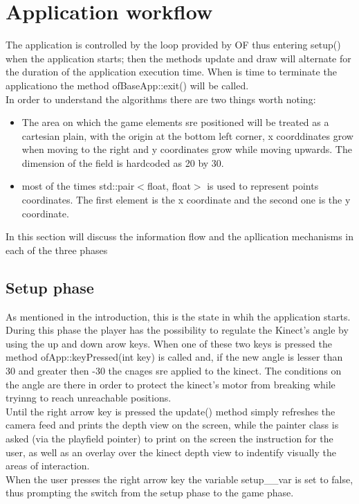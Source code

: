 \documentclass[]{article}
\begin{document}
\section{Application workflow}
The application is controlled by the loop provided by OF thus entering setup() when the application starts; then the methods update and draw will alternate for the duration of the application execution time. When is time to terminate the applicationo the method ofBaseApp::exit() will be called.\\
In order to understand the algorithms there are two things worth noting:
\begin{itemize}
	\item The area on which the game elements sre positioned will be treated as a cartesian plain, with the origin at the bottom left corner, x coorddinates grow when moving to the right and y coordinates grow while moving upwards. The dimension of the field is hardcoded as 20 by 30.
	\item most of the times std::pair$<$float, float$>$ is used to represent points coordinates. The first element is the x coordinate and the second one is the y coordinate. 
\end{itemize} 
In this section will discuss the information flow and the apllication mechanisms in each of the three phases
\subsection{Setup phase}
As mentioned in the introduction, this is the state in whih the application starts. During this phase the player has the possibility to regulate the Kinect's angle by using the up and down arow keys. When one of these
two keys is pressed the method ofApp::keyPressed(int key) is called and, if the new angle is lesser than 30 and greater then -30 the cnages sre applied to the kinect.
The conditions on the angle are there in order to protect the kinect's motor from breaking while tryinng to reach unreachable positions.\\
Until the right arrow key is pressed the update() method simply refreshes the camera feed and prints the depth view on the screen, while the painter class is asked (via the playfield pointer) to print on the screen the instruction for the user, as well as an overlay over the kinect depth view to indentify visually the areas of interaction.\\
When the user presses the right arrow key the variable setup\_\_var is set to false, thus prompting the switch from the setup phase to the game phase.
\newpage
\end{document}
